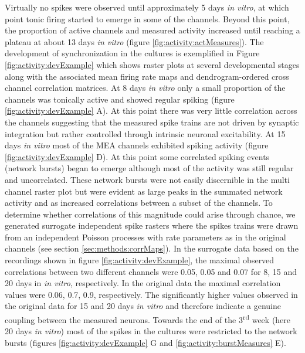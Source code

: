     Virtually no spikes were observed until approximately 5 days \textit{in vitro}, at which point tonic firing started to emerge in some of the channels. Beyond this point, the proportion of active channels and measured activity increased until reaching a plateau at about 13 days \textit{in vitro} (figure \ref{fig:activity:actMeasures}). The development of synchronization in the cultures is exemplified in Figure \ref{fig:activity:devExample} which shows raster plots at several developmental stages along with the associated mean firing rate maps and dendrogram-ordered cross channel correlation matrices. At 8 days \textit{in vitro} only a small proportion of the channels was tonically active and showed regular spiking (figure \ref{fig:activity:devExample} A). At this point there was very little correlation across the channels suggesting that the measured spike trains are not driven by synaptic integration but rather controlled through intrinsic neuronal excitability. At 15 days \textit{in vitro} most of the MEA channels exhibited spiking activity (figure \ref{fig:activity:devExample} D). At this point some correlated spiking events (network bursts) began to emerge although most of the activity was still regular and uncorrelated. These network bursts were not easily discernible in the multi channel raster plot but were evident as large peaks in the summated network activity and as increased correlations between a subset of the channels. To determine whether correlations of this magnitude could arise through chance, we generated surrogate independent spike rasters where the spikes trains were drawn from an independent Poisson processes with rate parameters as in the original channels (see section \ref{sec:methods:corrMaps}). In the surrogate data based on the recordings shown in figure \ref{fig:activity:devExample}, the maximal observed correlations between two different channels were 0.05, 0.05 and 0.07 for 8, 15 and 20 days in \textit{in vitro}, respectively. In the original data the maximal correlation values were 0.06, 0.7, 0.9, respectively. The significantly higher values observed in the original data for 15 and 20 days \textit{in vitro} and therefore indicate a genuine coupling between the measured neurons. Towards the end of the 3\textsuperscript{rd} week (here 20 days \textit{in vitro}) most of the spikes in the cultures were restricted to the network bursts (figures \ref{fig:activity:devExample} G and \ref{fig:activity:burstMeasures} E).

